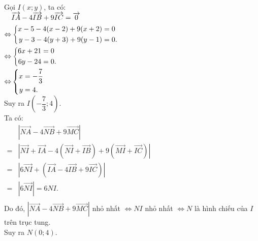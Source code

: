 \begin{bt}
{\begin{enumerate}[\bfseries a)]
		Gọi $I(x;y)$, ta có:\\
		$
		\begin{aligned}
				&\protect\overrightarrow{IA}-4\protect\overrightarrow{IB}+9\protect\overrightarrow{IC}=\protect\overrightarrow{0}\\
				\Leftrightarrow &\left\{\begin{aligned}x-5-4(x-2)+9(x+2)&=0\\y-3-4(y+3)+9(y-1)&=0.\end{aligned}\right.\\
				\Leftrightarrow &\left\{\begin{aligned}6x+21&=0\\6y-24&=0.\end{aligned}\right.\\
				\Leftrightarrow &\left\{\begin{aligned}x&=-\dfrac{7}{3}\\y&=4.\end{aligned}\right.\\
		\end{aligned}
		$\\
		Suy ra $I\left(-\dfrac{7}{3};4\right)$.\\
		Ta có:\\
			$
		\begin{aligned}
				&\left| \vec{NA}-4\vec{NB}+9\vec{MC} \right|\\
				=&\left| \vec{NI}+\vec{IA}-4\left(\vec{NI}+\vec{IB}\right)+9\left(\vec{MI}+\vec{IC}\right)\right|\\
				=&\left|6\vec{NI}+\left(\vec{IA}-4\vec{IB}+9\vec{IC}\right)\right|\\
				=&\left|6\vec{NI}\right|=6NI.\\				
		\end{aligned}
		$\\
		Do đó, $\left| \vec{NA}-4\vec{NB}+9\vec{MC} \right|$ nhỏ nhất $\Leftrightarrow NI$ nhỏ nhất $\Leftrightarrow N$ là hình chiếu của $I$ trên trục tung.\\
		Suy ra $N(0;4)$.
\end{enumerate}
}
\end{bt}
